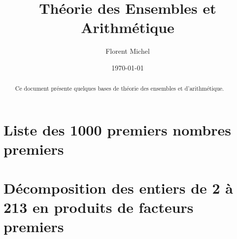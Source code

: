
 
\title{Théorie des Ensembles et Arithmétique}
\date{\today}
\author{%
Florent Michel \\ 
\Fstar} 

\newcommand{\inbox}[1]{\begin{tikzpicture}[baseline=-0.7ex, inner sep=0.5ex] \node[draw] {#1\vphantom{0123456789}}; \end{tikzpicture}}

 
\date{}
\maketitle 
\begin{abstract}
Ce document présente quelques bases de théorie des ensembles et d'arithmétique.
\end{abstract}
\bigskip
\begin{multicols}{2}
\renewcommand{\contentsname}{Table des matières}
\tableofcontents 
\end{multicols}

\clearpage



\clearpage



\clearpage

\appendix



\clearpage

\section{Liste des 1000 premiers nombres premiers} 

\noindent\textsf{}

\clearpage

\section{Décomposition des entiers de 2 à 213 en produits de facteurs premiers}

\begin{multicols}{4}

\end{multicols}


